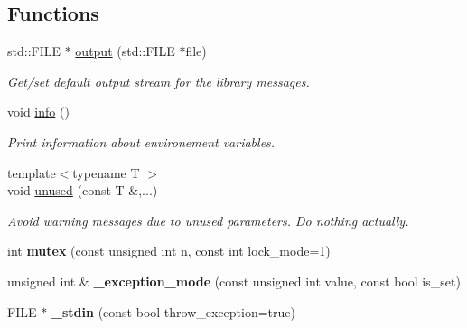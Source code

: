 \subsection*{Functions}
\begin{DoxyCompactItemize}
\item 
std\+::\+F\+I\+LE $\ast$ \hyperlink{namespacecimg__library__suffixed_1_1cimg_ada686776cc71803df391eea79cd1b3e5}{output} (std\+::\+F\+I\+LE $\ast$file)
\begin{DoxyCompactList}\small\item\em Get/set default output stream for the  library messages. \end{DoxyCompactList}\item 
void \hyperlink{namespacecimg__library__suffixed_1_1cimg_a79b7a247520612001a04d8ef1c2991dc}{info} ()
\begin{DoxyCompactList}\small\item\em Print information about  environement variables. \end{DoxyCompactList}\item 
\mbox{\label{namespacecimg__library__suffixed_1_1cimg_a79aef0cbcf66ceb71c2b74cb66b4deb2}} 
{\footnotesize template$<$typename T $>$ }\\void \hyperlink{namespacecimg__library__suffixed_1_1cimg_a79aef0cbcf66ceb71c2b74cb66b4deb2}{unused} (const T \&,...)
\begin{DoxyCompactList}\small\item\em Avoid warning messages due to unused parameters. Do nothing actually. \end{DoxyCompactList}\item 
\mbox{\label{namespacecimg__library__suffixed_1_1cimg_a9e739e4b4ac058abfba069466617b914}} 
int {\bfseries mutex} (const unsigned int n, const int lock\+\_\+mode=1)
\item 
\mbox{\label{namespacecimg__library__suffixed_1_1cimg_a6c578f866de2be9be7e385d693c758c8}} 
unsigned int \& {\bfseries \+\_\+exception\+\_\+mode} (const unsigned int value, const bool is\+\_\+set)
\item 
\mbox{\label{namespacecimg__library__suffixed_1_1cimg_a01a3b743897290604513ea6d847c9886}} 
F\+I\+LE $\ast$ {\bfseries \+\_\+stdin} (const bool throw\+\_\+exception=true)

\end{DoxyCompactItemize}
